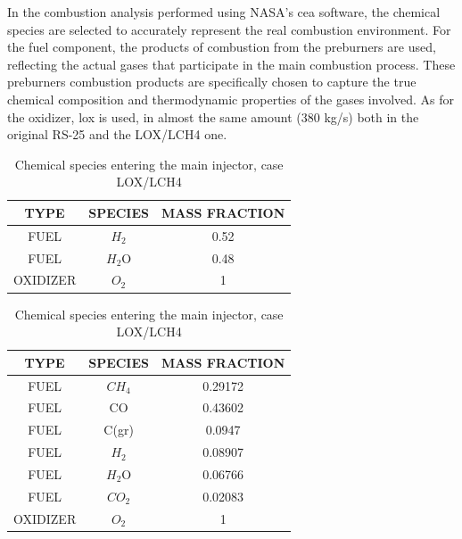 In the combustion analysis performed using NASA's \acrshort{cea} software, the chemical species are selected to accurately represent the real combustion environment.
For the fuel component, the products of combustion from the preburners are used, reflecting the actual gases that participate in the main combustion process.
These preburners combustion products are specifically chosen to capture the true chemical composition and thermodynamic properties of the gases involved. 
As for the oxidizer, \acrlong{lox} is used, in almost the same amount (380 kg/s) both in the original RS-25 and the LOX/LCH4 one.


\begin{table}[H]
    \centering
    \begin{minipage}{0.45\textwidth}
        \centering
        \begin{tabular}{|c|c|c|}
            \hline
            \textbf{TYPE} & \textbf{SPECIES} & \textbf{MASS FRACTION} \\
            \hline
          FUEL & $H_2$ & 0.52 \\
            \hline
             FUEL & $H_2$O & 0.48 \\
            \hline
            OXIDIZER & $O_2$ & 1 \\
            \hline
        \end{tabular}
        \caption{chemical species entering the main injector, case LOX/LH2}
        \label{tab:tabella1}
    \end{minipage}\hfill
    \begin{minipage}{0.45\textwidth}
        \centering
        \begin{tabular}{|c|c|c|}
            \hline
            \textbf{TYPE} & \textbf{SPECIES} & \textbf{MASS FRACTION} \\
            \hline
             FUEL & $CH_4$ & 0.29172 \\
            \hline
            FUEL & CO & 0.43602 \\
            \hline
            FUEL & C(gr) & 0.0947 \\
            \hline
            FUEL & $H_2$ & 0.08907 \\
            \hline
           FUEL & $H_2$O & 0.06766 \\
            \hline
            FUEL & $CO_2$ & 0.02083 \\
            \hline
            OXIDIZER & $O_2$ & 1 \\
            \hline
        \end{tabular}
        \caption{Chemical species entering the main injector, case LOX/LCH4}
        \label{tab:tabella2}
    \end{minipage}
    
\end{table}

